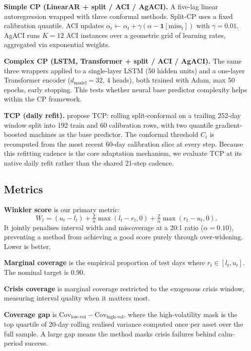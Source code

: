 \documentclass{article}
\begin{document}
\textbf{Simple CP (LinearAR + split / ACI / AgACI).} A five-lag linear autoregression wrapped with three conformal methods. Split-CP uses a fixed calibration quantile. ACI updates \(\alpha_t \leftarrow \alpha_t + \gamma(\alpha - \mathbf{1}[\text{miss}_t])\) with \(\gamma = 0.01\). AgACI runs \(K=12\) ACI instances over a geometric grid of learning rates, aggregated via exponential weights.

\textbf{Complex CP (LSTM, Transformer + split / ACI / AgACI).} The same three wrappers applied to a single-layer LSTM (50 hidden units) and a one-layer Transformer encoder (\(d_{\text{model}}=32\), 4 heads), both trained with Adam, max 50 epochs, early stopping. This tests whether neural base predictor complexity helps within the CP framework.

\textbf{TCP (daily refit).} \citet{aich2026} propose TCP: rolling split-conformal on a trailing 252-day window split into 192 train and 60 calibration rows, with two quantile gradient-boosted machines as the base predictor. The conformal threshold \(C_t\) is recomputed from the most recent 60-day calibration slice at every step. Because this refitting cadence is the core adaptation mechanism, we evaluate TCP at its native daily refit rather than the shared 21-step cadence.

\subsection{Metrics}

\textbf{Winkler score} \citep{winkler1972,gneiting2007} is our primary metric:
\[
  W_t = (u_t - l_t) + \tfrac{2}{\alpha}\max(l_t - r_t, 0) + \tfrac{2}{\alpha}\max(r_t - u_t, 0).
\]
It jointly penalises interval width and miscoverage at a 20:1 ratio (\(\alpha = 0.10\)), preventing a method from achieving a good score purely through over-widening. Lower is better.

\textbf{Marginal coverage} is the empirical proportion of test days where \(r_t \in [l_t, u_t]\). The nominal target is 0.90.

\textbf{Crisis coverage} is marginal coverage restricted to the exogenous crisis window, measuring interval quality when it matters most.

\textbf{Coverage gap} is \(\text{Cov}_{\text{low-vol}} - \text{Cov}_{\text{high-vol}}\), where the high-volatility mask is the top quartile of 20-day rolling realised variance computed once per asset over the full sample. A large gap means the method masks crisis failures behind calm-period success.
\end{document}
